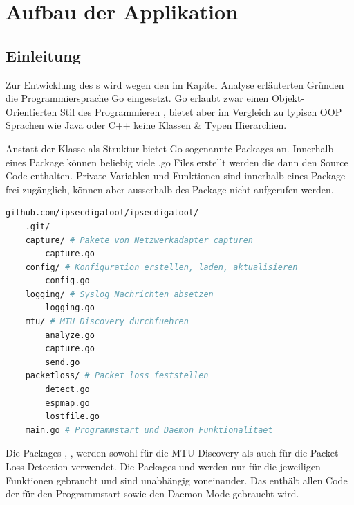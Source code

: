 \section{Aufbau der Applikation}
\label{sec:Aufbau der Applikation}

\subsection{Einleitung}
Zur Entwicklung des \tool{}s wird wegen den im Kapitel Analyse erläuterten Gründen die Programmiersprache Go eingesetzt. Go erlaubt zwar einen Objekt-Orientierten Stil des Programmieren \cite[:240]{golang_faq}, bietet aber im Vergleich zu typisch \acs{OOP} Sprachen wie Java oder C++ keine Klassen \& Typen Hierarchien.

Anstatt der Klasse als Struktur bietet Go sogenannte Packages an. Innerhalb eines Package können beliebig viele .go Files erstellt werden die dann den Source Code enthalten. Private Variablen und Funktionen sind innerhalb eines Package frei zugänglich, können aber ausserhalb des Package nicht aufgerufen werden.

\begin{lstlisting}[language=bash, caption=Package Struktur des \tool{}]                    
github.com/ipsecdigatool/ipsecdigatool/       
	.git/
	capture/ # Pakete von Netzwerkadapter capturen        
		capture.go
	config/ # Konfiguration erstellen, laden, aktualisieren
		config.go
	logging/ # Syslog Nachrichten absetzen
		logging.go
	mtu/ # MTU Discovery durchfuehren
		analyze.go
		capture.go
		send.go
	packetloss/ # Packet loss feststellen
		detect.go
		espmap.go
		lostfile.go
	main.go # Programmstart und Daemon Funktionalitaet
\end{lstlisting}

Die Packages , ,  werden sowohl für die \acs{MTU} Discovery als auch für die Packet Loss Detection verwendet. Die Packages  und  werden nur für die jeweiligen Funktionen gebraucht und sind unabhängig voneinander. Das  enthält allen Code der für den Programmstart sowie den Daemon Mode gebraucht wird.

